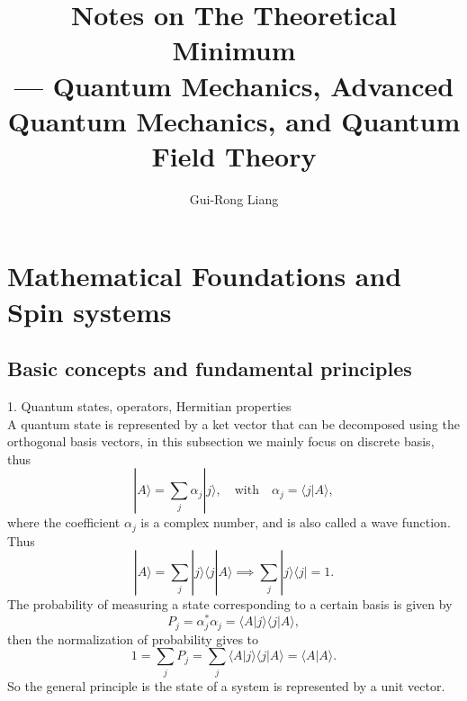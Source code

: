 \documentclass{article}
\title{Notes on The Theoretical Minimum\\
--- Quantum Mechanics, Advanced Quantum Mechanics, and Quantum Field Theory}
\author{Gui-Rong Liang}
\newcommand{\be}{\begin{equation}}
\newcommand{\ee}{\end{equation}}
\renewcommand{\1}{\left}
\renewcommand{\2}{\right}
\newcommand{\la}{\langle}
\newcommand{\ra}{\rangle}
\newcommand{\al}{\alpha}
\begin{document}
\maketitle
\tableofcontents

\newpage

\section{Mathematical Foundations and Spin systems}
\subsection{Basic concepts and fundamental principles}
1. Quantum states, operators, Hermitian properties\\

A quantum state is represented by a ket vector that can be decomposed using the orthogonal basis vectors, in this subsection we mainly focus on discrete basis, thus 
\be
|A\ra=\sum_j \al_j|j\ra, \quad\text{with} \quad \al_j=\la j|A\ra,
\ee
where the coefficient $\al_j$ is a complex number, and is also called a wave function. Thus
\be
|A\ra=\sum_j |j\ra \la j|A\ra \implies  \sum_j |j\ra \la j|=1.
\ee
The probability of measuring a state corresponding to a certain basis is given by
\be
P_j=\al_j^*\al_j=\la A |j\ra \la j|A\ra,
\ee
then the normalization of probability gives to 
\be
1=\sum_j P_j=\sum_j\la A |j\ra \la j|A\ra=\la A|A\ra.
\ee
So the general principle is the state of a system is represented by a unit vector.\\
\end{document}
